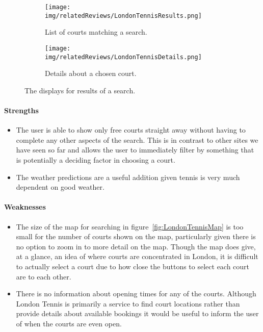 \begin{figure}[htbp]
	\centering
	\begin{subfigure}[b]{0.7\textwidth}
		\texttt{[image: img/relatedReviews/LondonTennisResults.png]}
		\caption{List of courts matching a search.
		}\label{fig:LondonTennisResults}
	\end{subfigure}
	\begin{subfigure}[b]{0.7\textwidth}
		\texttt{[image: img/relatedReviews/LondonTennisDetails.png]}
		\caption{Details about a chosen court. }\label{fig:LondonTennisDetails}
	\end{subfigure}
	\caption{The displays for results of a search.
	}\label{fig:LondonTennisResultsMain}
\end{figure}

\paragraph{Strengths}
\begin{itemize}
	\item The user is able to show only free courts straight away without
		having to complete any other aspects of the search. This is in contrast
		to other sites we have seen so far and allows the user to immediately
		filter by something that is potentially a deciding factor in choosing a
		court.
	\item The weather predictions are a useful addition given tennis is very
		much dependent on good weather.
\end{itemize}

\paragraph{Weaknesses}
\begin{itemize}
	\item The size of the map for searching in figure~\ref{fig:LondonTennisMap}
		is too small for the number of courts shown on the map, particularly
		given there is no option to zoom in to more detail on the map. Though
		the map does give, at a glance, an idea of where courts are
		concentrated in London, it is difficult to actually select a court due
		to how close the buttons to select each court are to each other.
	\item There is no information about opening times for any of the courts.
		Although London Tennis is primarily a service to find court locations
		rather than provide details about available bookings it would be useful
		to inform the user of when the courts are even open.
\end{itemize}

